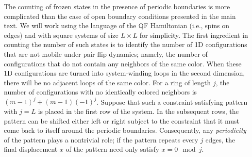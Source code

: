 The counting of frozen states in the presence of periodic boundaries is more complicated than the case of open boundary conditions presented in the main text.
We will work using the language of the QF Hamiltonian (i.e., spins on edges) and with square systems of size $L \times L$ for simplicity.
The first ingredient in counting the number of such states is to identify the number of 1D configurations that are not mobile under pair-flip dynamics; namely, the number of configurations that do not contain any neighbors of the same color. When these 1D configurations are turned into system-winding loops in the second dimension, there will be no adjacent loops of the same color. For a ring of length $j$, the number of configurations with no identically colored neighbors is $(m-1)^j + (m-1)(-1)^j$. Suppose that such a constraint-satisfying pattern with $j=L$ is placed in the first row of the system. In the subsequent rows, the pattern can be shifted either left or right subject to the constraint that it must come back to itself around the periodic boundaries. Consequently, any \emph{periodicity} of the pattern plays a nontrivial role; if the pattern repeats every $j$ edges, the final displacement $x$ of the pattern need only satisfy $x=0 \mod j$.


